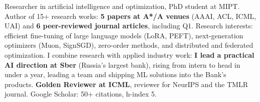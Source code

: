 
\begin{cvparagraph}

Researcher in artificial intelligence and optimization, PhD student at MIPT. Author of 15+ research works: \textbf{5 papers at A*/A venues} (AAAI, ACL, ICML, UAI) and \textbf{6 peer-reviewed journal articles}, including Q1. Research interests: efficient fine-tuning of large language models (LoRA, PEFT), next-generation optimizers (Muon, SignSGD), zero-order methods, and distributed and federated optimization. I combine research with applied industry work: \textbf{I lead a practical AI direction at Sber} (Russia's largest bank), rising from intern to head in under a year, leading a team and shipping ML solutions into the Bank's products. \textbf{Golden Reviewer at ICML}, reviewer for NeurIPS and the TMLR journal. Google Scholar: 50+ citations, h-index 5.

\end{cvparagraph}
